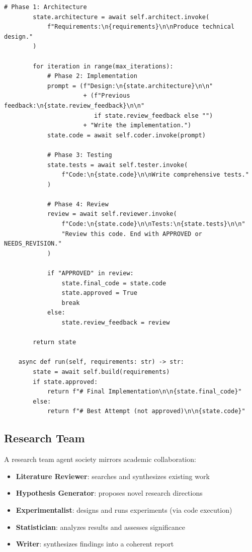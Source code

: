 \begin{lstlisting}[style=pythonstyle]
        # Phase 1: Architecture
        state.architecture = await self.architect.invoke(
            f"Requirements:\n{requirements}\n\nProduce technical design."
        )

        for iteration in range(max_iterations):
            # Phase 2: Implementation
            prompt = (f"Design:\n{state.architecture}\n\n"
                      + (f"Previous feedback:\n{state.review_feedback}\n\n"
                         if state.review_feedback else "")
                      + "Write the implementation.")
            state.code = await self.coder.invoke(prompt)

            # Phase 3: Testing
            state.tests = await self.tester.invoke(
                f"Code:\n{state.code}\n\nWrite comprehensive tests."
            )

            # Phase 4: Review
            review = await self.reviewer.invoke(
                f"Code:\n{state.code}\n\nTests:\n{state.tests}\n\n"
                "Review this code. End with APPROVED or NEEDS_REVISION."
            )

            if "APPROVED" in review:
                state.final_code = state.code
                state.approved = True
                break
            else:
                state.review_feedback = review

        return state

    async def run(self, requirements: str) -> str:
        state = await self.build(requirements)
        if state.approved:
            return f"# Final Implementation\n\n{state.final_code}"
        else:
            return f"# Best Attempt (not approved)\n\n{state.code}"
\end{lstlisting}

\subsection{Research Team}
\label{research-team}

A research team agent society mirrors academic collaboration:

\begin{itemize}
  \item \textbf{Literature Reviewer}: searches and synthesizes existing work
  \item \textbf{Hypothesis Generator}: proposes novel research directions
  \item \textbf{Experimentalist}: designs and runs experiments (via code execution)
  \item \textbf{Statistician}: analyzes results and assesses significance
  \item \textbf{Writer}: synthesizes findings into a coherent report
\end{itemize}

